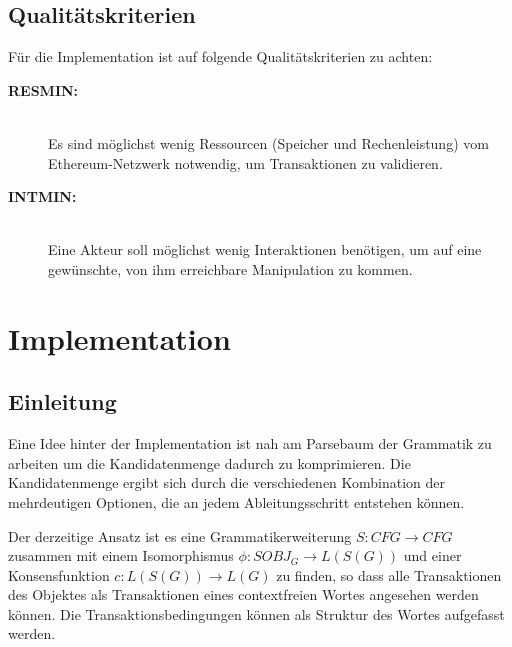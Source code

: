 \documentclass[]{article}
\begin{document}
\subsection {Qualitätskriterien}

Für die Implementation ist auf folgende Qualitätskriterien zu achten:

\begin{description} 
  \item[\textbf{RESMIN:}]\hfill \\
    Es sind möglichst wenig Ressourcen (Speicher und Rechenleistung) vom Ethereum-Netzwerk notwendig, um Transaktionen zu validieren.
  \item[\textbf{INTMIN:}]\hfill \\
    Eine Akteur soll möglichst wenig Interaktionen benötigen, um auf eine gewünschte, von ihm erreichbare Manipulation zu kommen.
\end{description}

% 

% 






\section{Implementation}

\subsection{Einleitung}
Eine Idee hinter der Implementation ist nah am Parsebaum der Grammatik zu arbeiten um die Kandidatenmenge dadurch zu komprimieren. Die Kandidatenmenge ergibt sich durch die verschiedenen Kombination der mehrdeutigen Optionen, die an jedem Ableitungsschritt entstehen können.

Der derzeitige Ansatz ist es eine Grammatikerweiterung $S: CFG \rightarrow CFG$ zusammen mit einem Isomorphismus $\phi: SOBJ_G \rightarrow L(S(G))$ und einer Konsensfunktion $c: L(S(G)) \rightarrow L(G)$ zu finden, so dass alle Transaktionen des Objektes als Transaktionen eines contextfreien Wortes angesehen werden können. Die Transaktionsbedingungen können als Struktur des Wortes aufgefasst werden.
\end{document}
